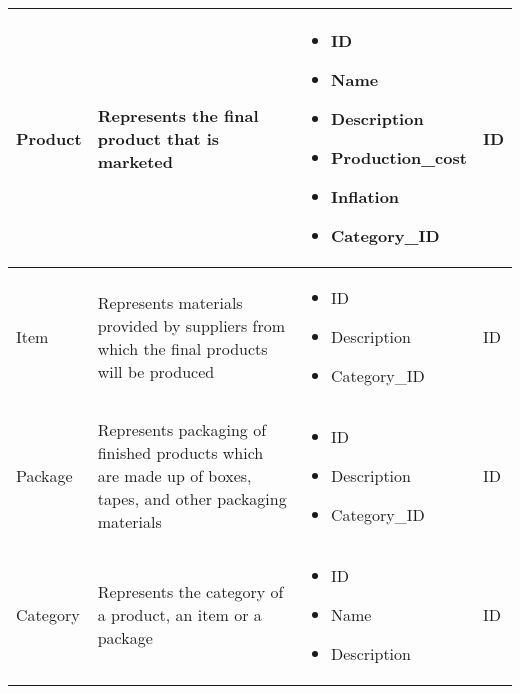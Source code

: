 \begin{longtable}{|p{}|p{} |p{}|p{} |}
    Product & Represents the final product that is marketed &
    \begin{itemize}
        \vspace{-1em}
        \item ID
        \item Name
        \item Description           %
        \item Production\_cost      %
        \item Inflation             %
        \item Category\_ID
    \end{itemize}
    &  ID \\\hline

    Item & Represents materials provided by suppliers from which the final products will be produced &
    \begin{itemize}
        \vspace{-1em}
        \item ID
        \item Description
        \item Category\_ID
    \end{itemize}
    &  ID \\\hline

    Package & Represents packaging of finished products which are made up of boxes, tapes, and other packaging materials &
    \begin{itemize}
        \vspace{-1em}
        \item ID
        \item Description
        \item Category\_ID %
    \end{itemize}
    &  ID \\\hline

    Category & Represents the category of a product, an item or a package &
    \begin{itemize}
        \vspace{-1em}
        \item ID
        \item Name
        \item Description
    \end{itemize}
    &  ID \\\hline


\end{longtable}

